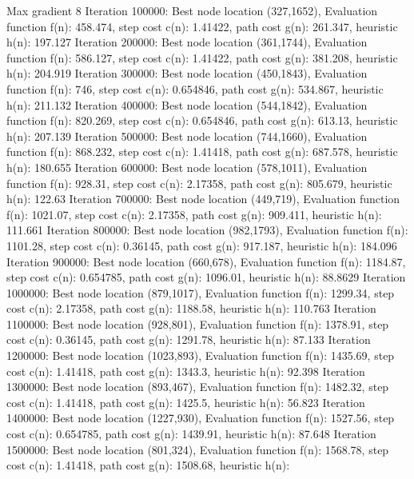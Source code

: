 \begin{DoxyCode}
Max gradient 8
Iteration 100000: Best node location (327,1652), 
     Evaluation function f(n): 458.474, step cost c(n): 1.41422, path cost g(n): 261.347, heuristic h(n):
       197.127
Iteration 200000: Best node location (361,1744), 
     Evaluation function f(n): 586.127, step cost c(n): 1.41422, path cost g(n): 381.208, heuristic h(n):
       204.919
Iteration 300000: Best node location (450,1843), 
     Evaluation function f(n): 746, step cost c(n): 0.654846, path cost g(n): 534.867, heuristic h(n):
       211.132
Iteration 400000: Best node location (544,1842), 
     Evaluation function f(n): 820.269, step cost c(n): 0.654846, path cost g(n): 613.13, heuristic h(n):
       207.139
Iteration 500000: Best node location (744,1660), 
     Evaluation function f(n): 868.232, step cost c(n): 1.41418, path cost g(n): 687.578, heuristic h(n):
       180.655
Iteration 600000: Best node location (578,1011), 
     Evaluation function f(n): 928.31, step cost c(n): 2.17358, path cost g(n): 805.679, heuristic h(n):
       122.63
Iteration 700000: Best node location (449,719), 
     Evaluation function f(n): 1021.07, step cost c(n): 2.17358, path cost g(n): 909.411, heuristic h(n):
       111.661
Iteration 800000: Best node location (982,1793), 
     Evaluation function f(n): 1101.28, step cost c(n): 0.36145, path cost g(n): 917.187, heuristic h(n):
       184.096
Iteration 900000: Best node location (660,678), 
     Evaluation function f(n): 1184.87, step cost c(n): 0.654785, path cost g(n): 1096.01, heuristic h(n):
       88.8629
Iteration 1000000: Best node location (879,1017), 
     Evaluation function f(n): 1299.34, step cost c(n): 2.17358, path cost g(n): 1188.58, heuristic h(n):
       110.763
Iteration 1100000: Best node location (928,801), 
     Evaluation function f(n): 1378.91, step cost c(n): 0.36145, path cost g(n): 1291.78, heuristic h(n):
       87.133
Iteration 1200000: Best node location (1023,893), 
     Evaluation function f(n): 1435.69, step cost c(n): 1.41418, path cost g(n): 1343.3, heuristic h(n):
       92.398
Iteration 1300000: Best node location (893,467), 
     Evaluation function f(n): 1482.32, step cost c(n): 1.41418, path cost g(n): 1425.5, heuristic h(n):
       56.823
Iteration 1400000: Best node location (1227,930), 
     Evaluation function f(n): 1527.56, step cost c(n): 0.654785, path cost g(n): 1439.91, heuristic h(n):
       87.648
Iteration 1500000: Best node location (801,324), 
     Evaluation function f(n): 1568.78, step cost c(n): 1.41418, path cost g(n): 1508.68, heuristic h(n):

\end{DoxyCode}
